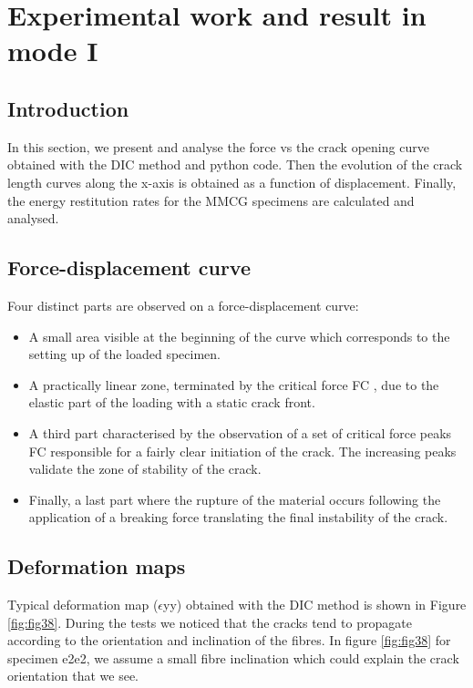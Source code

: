 \chapter{Experimental work and result in mode I}
\label{Chapter3}

\section{Introduction}

In this section, we present and analyse the force vs the crack opening curve obtained with the DIC method and python code.  Then the evolution of the crack length curves along the x-axis is obtained as a function of displacement. Finally, the energy restitution rates for the MMCG specimens are calculated and analysed.

\section{Force-displacement curve}

Four distinct parts are observed on a force-displacement curve:

\begin{itemize}
	\item A small area visible at the beginning of the curve which corresponds to the setting up of the loaded specimen. 
	\item A practically linear zone, terminated by the critical force FC , due to the elastic part of the loading with a static crack front.
	\item A third part characterised by the observation of a set of critical force peaks FC responsible for a fairly clear initiation of the crack. The increasing peaks validate the zone of stability of the crack.
	\item Finally, a last part where the rupture of the material occurs following the application of a breaking force translating the final instability of the crack.
\end{itemize}


\section{Deformation maps}

Typical deformation map ($\epsilon$yy) obtained with the DIC method is shown in Figure \ref{fig:fig38}.
During the tests we noticed that the cracks tend to propagate according to the orientation and inclination of the fibres.
In figure \ref{fig:fig38} for specimen e2e2, we assume a small fibre inclination which could explain the crack orientation that we see.

